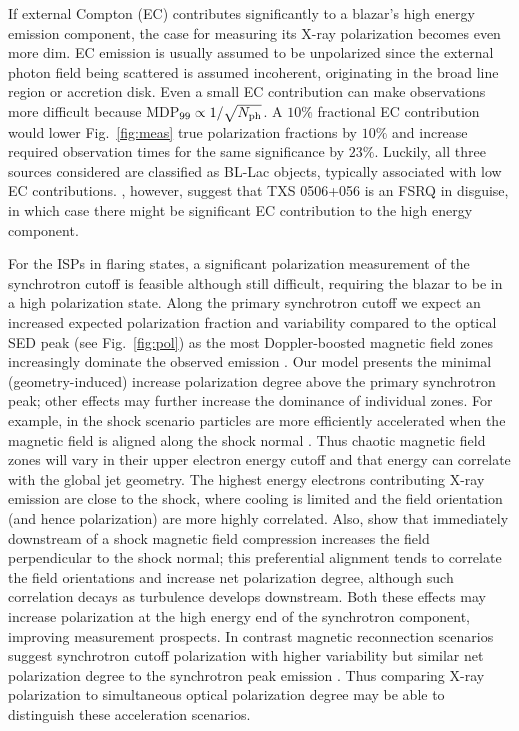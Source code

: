 If external Compton (EC) contributes significantly to a blazar's high energy emission component, the case for measuring its X-ray polarization becomes even more dim. EC emission is usually assumed to be unpolarized \citep{zhang_x-ray_2013} since the external photon field being scattered is assumed incoherent, originating in the broad line region or accretion disk. Even a small EC contribution can make observations more difficult because MDP$_{99} \propto 1/\sqrt{N_{\rm ph}}$. A $10\%$ fractional EC contribution would lower Fig.~\ref{fig:meas} true polarization fractions by $10\%$ and increase required observation times for the same significance by $23\%$. 
Luckily, all three sources considered are classified as BL-Lac objects, typically associated with low EC contributions. \citet{padovani_txs_2019}, however, suggest that TXS 0506+056 is an FSRQ in disguise, in which case there might be significant EC contribution to the high energy component.

For the ISPs in flaring states, a significant polarization measurement of the synchrotron cutoff is feasible although still difficult, requiring the blazar to be in a high polarization state. Along the primary synchrotron cutoff we expect an increased expected polarization fraction and variability compared to the optical SED peak (see Fig.~\ref{fig:pol}) as the most Doppler-boosted magnetic field zones increasingly dominate the observed emission \citep{peirson_polarization_2019}.
Our model presents the minimal (geometry-induced) increase polarization degree above the primary synchrotron peak; other effects may further increase the dominance of individual zones.
For example, in the shock scenario particles are more efficiently accelerated when the magnetic field is aligned along the shock normal \citep{marscher_turbulent_2014}. Thus chaotic magnetic field zones will vary in their upper electron energy cutoff and that energy can correlate with the global jet geometry. The highest energy electrons contributing X-ray emission are close to the shock, where cooling is limited and the field orientation (and hence polarization) are more highly correlated. Also, \citet{tavecchio_probing_2018} show that immediately downstream of a shock magnetic field compression increases the field perpendicular to the shock normal; this preferential alignment tends to correlate the field orientations and increase net polarization degree, although such correlation decays as turbulence develops downstream. Both these effects may increase polarization at the high energy end of the synchrotron component, improving measurement prospects.  In contrast magnetic reconnection scenarios suggest synchrotron cutoff polarization with higher variability but similar net polarization degree to the synchrotron peak emission \citep{zhang_radiation_2020, tavecchio_probing_2018}. Thus comparing X-ray polarization to simultaneous optical polarization degree may be able to distinguish these acceleration scenarios. 

